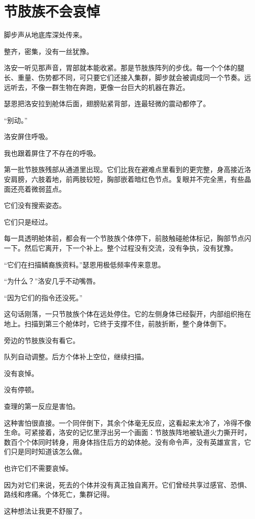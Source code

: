 \chapter{节肢族不会哀悼}

脚步声从地底库深处传来。

整齐，密集，没有一丝犹豫。

洛安一听见那声音，胃部就本能收紧。那是节肢族阵列的步伐。每一个个体的腿长、重量、伤势都不同，可只要它们还接入集群，脚步就会被调成同一个节奏。远远听去，不像一群生物在奔跑，更像一台巨大的机器在靠近。

瑟恩把洛安拉到舱体后面，翅膀贴紧背部，连最轻微的震动都停了。

“别动。”

洛安屏住呼吸。

我也跟着屏住了不存在的呼吸。

第一批节肢族残部从通道里出现。它们比我在避难点里看到的更完整，身高接近洛安肩膀，六肢着地，前两肢较短，胸部嵌着暗红色节点。复眼并不完全黑，有些晶面还亮着微弱蓝点。

它们没有搜索姿态。

它们只是经过。

每一具透明舱体前，都会有一个节肢族个体停下，前肢触碰舱体标记，胸部节点闪一下。然后它离开，下一个补上。整个过程没有交流，没有争执，没有犹豫。

“它们在扫描鳞裔族资料。”瑟恩用极低频率传来意思。

“为什么？”洛安几乎不动嘴唇。

“因为它们的指令还没死。”

这句话刚落，一只节肢族个体在远处停住。它的左侧身体已经裂开，内部组织拖在地上。扫描到第三个舱体时，它终于支撑不住，前肢折断，整个身体倒下。

旁边的节肢族没有看它。

队列自动调整。后方个体补上空位，继续扫描。

没有哀悼。

没有停顿。

查理的第一反应是害怕。

这种害怕很直接。一个同伴倒下，其余个体毫无反应，这看起来太冷了，冷得不像生命。可紧接着，洛安的记忆里浮出另一个画面：节肢族阵地被轨道火力撕开时，数百个个体同时转身，用身体挡住后方的幼体舱。没有命令声，没有英雄宣言，它们只是同时知道该怎么做。

也许它们不需要哀悼。

因为对它们来说，死去的个体并没有真正独自离开。它们曾经共享过感官、恐惧、路线和疼痛。个体死亡，集群记得。

这种想法让我更不舒服了。

